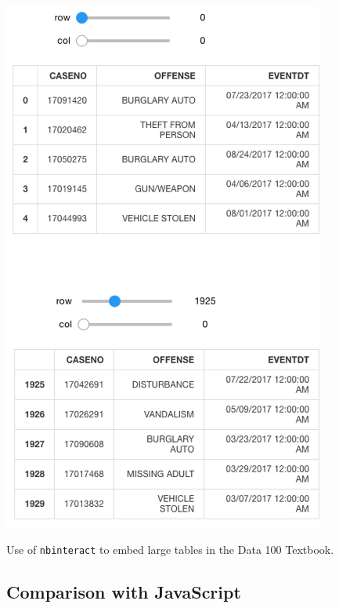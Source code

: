 \documentclass[nobib]{tufte-handout}
\newcommand{\code}[1]{\texttt{#1}}
\begin{document}
\begin{marginfigure}%
  \includegraphics[width=\linewidth]{graphics/df-interact.png}
  \caption{Use of \code{nbinteract} to embed large tables in the Data 100
  Textbook.}
  \label{fig:df-interact}
\end{marginfigure}


\subsection{Comparison with JavaScript} %
\label{sub:comparison_with_javascript}
\end{document}
